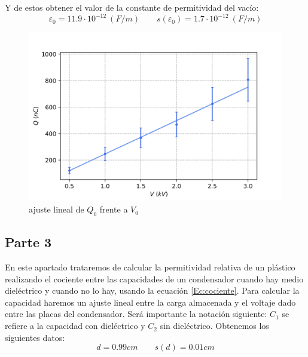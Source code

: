 \documentclass[12pt,a4paper]{article}
\begin{document}
Y de estos obtener el valor de la constante de permitividad del vacío: \\
 
\begin{equation}
\varepsilon_0 = 11.9 \cdot 10^{-12} \ (F/m) \quad \quad s(\varepsilon_0)=1.7 \cdot 10^{-12} \ (F/m)
\end{equation}
 
\begin{figure}[h!] \centering
\includegraphics[scale=0.95]{plot2.png}
\caption{ajuste lineal de $Q_0$ frente a $V_0$}
\label{Fig:regresion2}
\end{figure}

\subsection{Parte 3}

En este apartado trataremos de calcular la permitividad relativa de un plástico realizando el cociente entre las capacidades de un condensador cuando hay medio dieléctrico y cuando no lo hay, usando la ecuación \ref{Ec:cociente}. Para calcular la capacidad haremos un ajuste lineal entre la carga almacenada y el voltaje dado entre las placas del condensador. Será importante la notación siguiente: $C_1$ se refiere a la capacidad con dieléctrico y $C_2$ sin dieléctrico. Obtenemos los siguientes datos:  \\

$$ d = 0.99 cm \quad \quad s(d) = 0.01 cm $$
\end{document}
